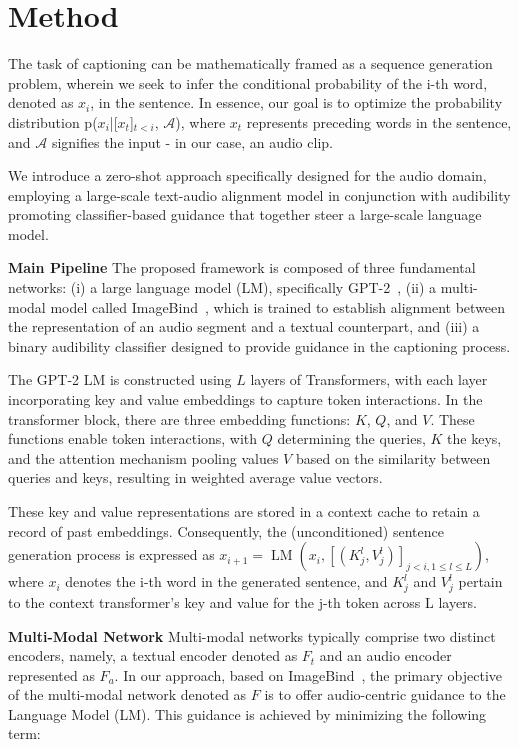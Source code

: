 \documentclass{article}
\begin{document}
\section{Method}





The task of captioning can be mathematically framed as a sequence generation problem, wherein we seek to infer the conditional probability of the i-th word, denoted as $x_i$, in the sentence. In essence, our goal is to optimize the probability distribution p($x_i$|[$x_t$]$_{t<i}$, $\mathcal{A}$), where $x_t$ represents preceding words in the sentence, and $\mathcal{A}$ signifies the input - in our case, an audio clip.

We introduce a zero-shot approach specifically designed for the audio domain, employing a large-scale text-audio alignment model in conjunction with audibility promoting classifier-based guidance that together steer a large-scale language model.

\noindent\textbf{Main Pipeline\quad}
The proposed framework is composed of three fundamental networks: (i) a large language model (LM), specifically GPT-2~\cite{radford2019language}, (ii) a multi-modal model called ImageBind~\cite{girdhar2023imagebind}, which is trained to establish alignment between the representation of an audio segment and a textual counterpart, and (iii) a binary audibility classifier designed to provide guidance in the captioning process.

The GPT-2 LM is constructed using  $L$ layers of Transformers, with each layer incorporating key and value embeddings to capture token interactions. In the transformer block, there are three embedding functions: $K$, $Q$, and $V$. These functions enable token interactions, with $Q$ determining the queries, $K$ the keys, and the attention mechanism pooling values $V$ based on the similarity between queries and keys, resulting in weighted average value vectors.

These key and value representations are stored in a context cache to retain a record of past embeddings. Consequently, the (unconditioned) sentence generation process is expressed as $x_{i+1} = \operatorname{LM}\left( x_i, [(K_j^l, V_j^l)]_{j<i,1\leq l\leq L} \right)$, where $x_i$ denotes the i-th word in the generated sentence, and $K_j^l$ and $V_j^l$ pertain to the context transformer's key and value for the j-th token across L layers. 

\noindent\textbf{Multi-Modal Network\quad}
Multi-modal networks typically comprise two distinct encoders, namely, a textual encoder denoted as $F_t$ and an audio encoder represented as $F_a$. In our approach, based on ImageBind~\cite{girdhar2023imagebind}, the primary objective of the multi-modal network denoted as $F$ is to offer audio-centric guidance to the Language Model (LM). This guidance is achieved by minimizing the following term:
\end{document}
